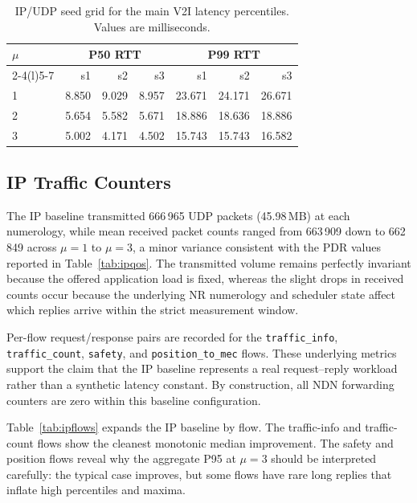 \documentclass[journal]{IEEEtran}
\newcommand{\micro}{$\mu$}
\newcommand{\code}[1]{\texttt{\small #1}}
\begin{document}
\begin{table}[!t]\centering
\caption{IP/UDP seed grid for the main V2I latency percentiles. Values are milliseconds.}
\label{tab:ipmu3stats}
\scriptsize
\setlength{\tabcolsep}{3pt}
\begin{tabular}{@{}lrrrrrr@{}}
\toprule
\multirow{2}{*}{\micro} & \multicolumn{3}{c}{P50 RTT} & \multicolumn{3}{c}{P99 RTT}\\
\cmidrule(lr){2-4}\cmidrule(l){5-7}
& s1 & s2 & s3 & s1 & s2 & s3\\
\midrule
1 & 8.850 & 9.029 & 8.957 & 23.671 & 24.171 & 26.671\\
2 & 5.654 & 5.582 & 5.671 & 18.886 & 18.636 & 18.886\\
3 & 5.002 & 4.171 & 4.502 & 15.743 & 15.743 & 16.582\\
\bottomrule
\end{tabular}
\end{table}


\subsection{IP Traffic Counters}

The IP baseline transmitted 666\,965 UDP packets (45.98\,MB) at each numerology, while mean received packet counts ranged from 663\,909 down to 662\,849 across $\mu=1$ to $\mu=3$, a minor variance consistent with the PDR values reported in Table~\ref{tab:ipqos}. The transmitted volume remains perfectly invariant because the offered application load is fixed, whereas the slight drops in received counts occur because the underlying NR numerology and scheduler state affect which replies arrive within the strict measurement window.

Per-flow request/response pairs are recorded for the \code{traffic\_info}, \code{traffic\_count}, \code{safety}, and \code{position\_to\_mec} flows. These underlying metrics support the claim that the IP baseline represents a real request--reply workload rather than a synthetic latency constant. By construction, all NDN forwarding counters are zero within this baseline configuration.

Table~\ref{tab:ipflows} expands the IP baseline by flow. The traffic-info and traffic-count flows show the cleanest monotonic median improvement. The safety and position flows reveal why the aggregate P95 at $\mu=3$ should be interpreted carefully: the typical case improves, but some flows have rare long replies that inflate high percentiles and maxima.
\end{document}
